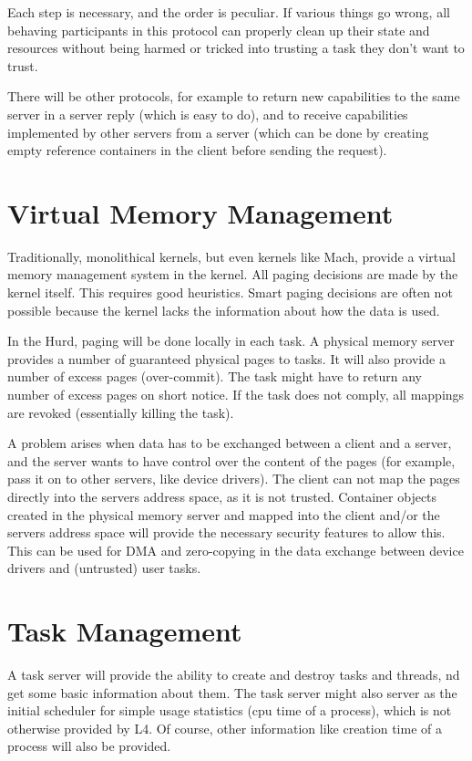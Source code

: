 \documentclass[9pt,a4paper]{extarticle}
\begin{document}
Each step is necessary, and the order is peculiar.  If various things
go wrong, all behaving participants in this protocol can properly
clean up their state and resources without being harmed or tricked
into trusting a task they don't want to trust.

There will be other protocols, for example to return new capabilities
to the same server in a server reply (which is easy to do), and to
receive capabilities implemented by other servers from a server (which
can be done by creating empty reference containers in the client
before sending the request).


\section{Virtual Memory Management}

Traditionally, monolithical kernels, but even kernels like Mach,
provide a virtual memory management system in the kernel.  All paging
decisions are made by the kernel itself.  This requires good
heuristics.  Smart paging decisions are often not possible because the
kernel lacks the information about how the data is used.

In the Hurd, paging will be done locally in each task.  A physical
memory server provides a number of guaranteed physical pages to tasks.
It will also provide a number of excess pages (over-commit).  The task
might have to return any number of excess pages on short notice.  If
the task does not comply, all mappings are revoked (essentially
killing the task).

A problem arises when data has to be exchanged between a client and a
server, and the server wants to have control over the content of the
pages (for example, pass it on to other servers, like device drivers).
The client can not map the pages directly into the servers address
space, as it is not trusted.  Container objects created in the
physical memory server and mapped into the client and/or the servers
address space will provide the necessary security features to allow
this.  This can be used for DMA and zero-copying in the data exchange
between device drivers and (untrusted) user tasks.


\section{Task Management}

A task server will provide the ability to create and destroy tasks and
threads, nd get some basic information about them.  The task server
might also server as the initial scheduler for simple usage statistics
(cpu time of a process), which is not otherwise provided by L4.  Of
course, other information like creation time of a process will also be
provided.
\end{document}
